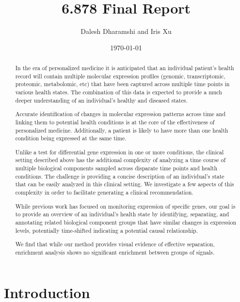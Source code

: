 \documentclass[aps,prd,final,onecolumn,a4paper,10pt]{revtex4}
\begin{document}
\title{6.878 Final Report}
\author{Dalesh Dharamshi and Iris Xu}
\date{\today} 

\begin{abstract}
\noindent
  In the era of personalized medicine it is anticipated that an individual patient's health record will contain multiple molecular expression profiles (genomic, transcriptomic, proteomic, metabolomic, etc) that have been captured across multiple time points in various health states. The combination of this data is expected to provide a much deeper understanding of an individual’s healthy and diseased states.

  Accurate identification of changes in molecular expression patterns across time and linking them to potential health conditions is at the core of the effectiveness of personalized medicine. Additionally, a patient is likely to have more than one health condition being expressed at the same time.

  Unlike a test for differential gene expression in one or more conditions, the clinical setting described above has the additional complexity of analyzing a time course of multiple biological components sampled across disparate time points and health conditions. The challenge is providing a concise description of an individual’s state that can be easily analyzed in this clinical setting. We investigate a few aspects of this complexity in order to facilitate generating a clinical recommendation.

  While previous work has focused on monitoring expression of specific genes, our goal is to provide an overview of an individual’s health state by identifying, separating, and annotating related biological component groups that have similar changes in expression levels, potentially time-shifted indicating a potential causal relationship.

  We find that while our method provides visual evidence of effective separation, enrichment analysis shows no significant enrichment between groups of signals.


\end{abstract}

\maketitle

\pagestyle{myheadings}
\thispagestyle{empty}

\section{Introduction}
\end{document}
